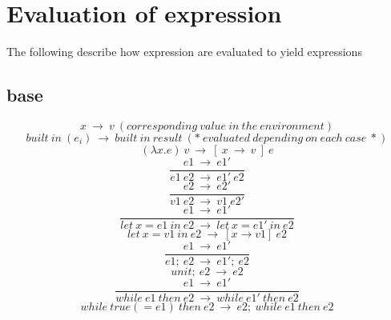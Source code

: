 \documentclass[10pt,a4paper]{article}
\begin{document}
\section*{ Evaluation of expression }
The following describe how expression are evaluated to yield expressions 

\subsection*{ base }
\begin{equation}x\ \rightarrow \ v\ (corresponding\ value\ in\ the\ environment)\ \tag{\ E-VARIABLE\ }\end{equation}
\begin{equation}built\ in\ (e_i)\ \rightarrow \ built\ in\ result                           \ (*\ evaluated\ depending\ on\ each\ case\ *)\ \tag{\ E-BUILTIN\ }\end{equation}
\begin{equation}(\lambda x.e)\ v\ \rightarrow \ [\ x\ \rightarrow \ v\ ]\ e\ \tag{\ E-LAMBDA\ }\end{equation}
\begin{equation}\frac{e1\ \rightarrow \ e1'}{e1\ e2\ \rightarrow \ e1'\ e2}\ \tag{\ E-APP1\ }\end{equation}
\begin{equation}\frac{e2\ \rightarrow \ e2'}{v1\ e2\ \rightarrow \ v1\ e2'}\ \tag{\ E-APP2\ }\end{equation}
\begin{equation}\frac{e1\ \rightarrow \ e1'}{let\ x=e1\ in\ e2\ \rightarrow \ let\ x=e1'\ in\ e2}\ \tag{\ E-LET\ }\end{equation}
\begin{equation}let\ x=v1\ in\ e2\ \rightarrow \ [x\rightarrow v1]\ e2\ \tag{\ E-LETIN\ }\end{equation} 
\begin{equation}\frac{e1\ \rightarrow \ e1'}{e1;\ e2\ \rightarrow \ e1';\ e2}\ \tag{\ E-SEQ\ }\end{equation}
\begin{equation}unit;\ e2\ \rightarrow \ e2\ \tag{\ E-SEQNEXT\ }\end{equation}
\begin{equation}\frac{e1\ \rightarrow \ e1'}{while\ e1\ then\ e2\ \rightarrow \ while\ e1'\ then\ e2}\ \tag{\ E-LOOP\ }\end{equation}
\begin{equation}while\ true(=e1)\ then\ e2\ \rightarrow \ e2;\ while\ e1\ then\ e2\ \tag{\ E-LOOPTRUE\ }\end{equation}
\end{document}
